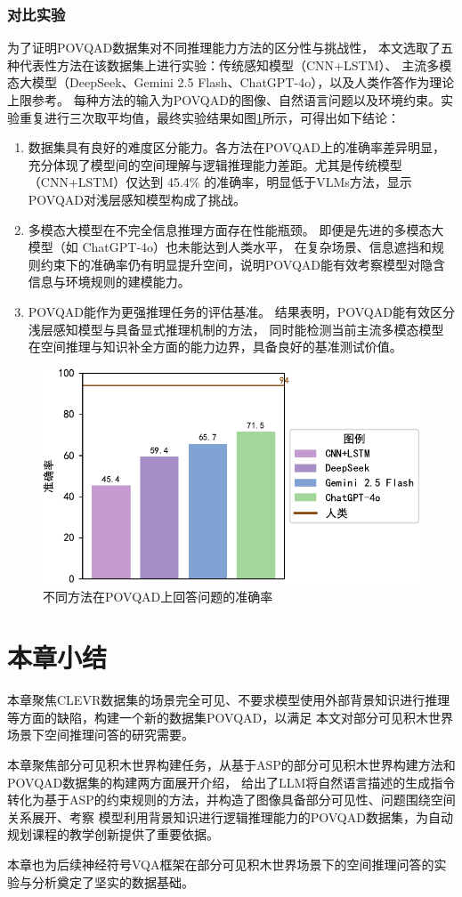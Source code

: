 \subsubsection{对比实验}
为了证明POVQAD数据集对不同推理能力方法的区分性与挑战性，
本文选取了五种代表性方法在该数据集上进行实验：传统感知模型（CNN+LSTM）、
主流多模态大模型（DeepSeek、Gemini 2.5 Flash、ChatGPT-4o），以及人类作答作为理论上限参考。
每种方法的输入为POVQAD的图像、自然语言问题以及环境约束。实验重复进行三次取平均值，最终实验结果如图\ref{fig:dataset-comparison}所示，可得出如下结论：
\begin{enumerate}[nosep]
\item 数据集具有良好的难度区分能力。各方法在POVQAD上的准确率差异明显，充分体现了模型间的空间理解与逻辑推理能力差距。尤其是传统模型（CNN+LSTM）仅达到 45.4\% 的准确率，明显低于VLMs方法，显示POVQAD对浅层感知模型构成了挑战。
\item 多模态大模型在不完全信息推理方面存在性能瓶颈。
即便是先进的多模态大模型（如 ChatGPT-4o）也未能达到人类水平，
在复杂场景、信息遮挡和规则约束下的准确率仍有明显提升空间，说明POVQAD能有效考察模型对隐含信息与环境规则的建模能力。
\item POVQAD能作为更强推理任务的评估基准。
结果表明，POVQAD能有效区分浅层感知模型与具备显式推理机制的方法，
同时能检测当前主流多模态模型在空间推理与知识补全方面的能力边界，具备良好的基准测试价值。
\end{enumerate}
\begin{figure}[h]
\centering
\includegraphics[scale=0.8]{figures/dataset-experiment-crop.pdf}
\caption{不同方法在POVQAD上回答问题的准确率}
\label{fig:dataset-comparison}
\end{figure}
\section{本章小结}
本章聚焦CLEVR数据集的场景完全可见、不要求模型使用外部背景知识进行推理等方面的缺陷，构建一个新的数据集POVQAD，以满足
本文对部分可见积木世界场景下空间推理问答的研究需要。

本章聚焦部分可见积木世界构建任务，从基于ASP的部分可见积木世界构建方法和POVQAD数据集的构建两方面展开介绍，
给出了LLM将自然语言描述的生成指令转化为基于ASP的约束规则的方法，并构造了图像具备部分可见性、问题围绕空间关系展开、考察
模型利用背景知识进行逻辑推理能力的POVQAD数据集，为自动规划课程的教学创新提供了重要依据。

本章也为后续神经符号VQA框架在部分可见积木世界场景下的空间推理问答的实验与分析奠定了坚实的数据基础。